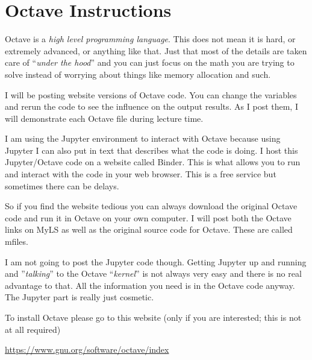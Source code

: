 \documentclass[11pt,letterpaper]{article}
\begin{document}

\section*{Octave Instructions}

Octave is a \textit{high level programming language}.  This does not mean it is hard, or extremely advanced, or anything like that. Just that most of the details are taken care of ``\textit{under the hood}'' and  you can just focus on the math you are trying to solve instead of worrying about things like memory allocation and such.

I will be posting website versions of Octave code.  You can change the variables and rerun the code to see the influence on the output results. As I post them, I will demonstrate each Octave file during lecture time.

I am using the Jupyter environment to interact with Octave because using Jupyter I can also put in text that describes what the code is doing.  I host this Jupyter/Octave code on a website called Binder. This is what allows  you to run and interact with the code in your web browser.  This is a free service but sometimes there can be delays.

So if you find the website tedious you can always download the original Octave code and run it in Octave on your own computer.  I will post both the Octave links on MyLS as well as the original source code for Octave.  These are called mfiles.

I am not going to post the Jupyter code though.  Getting Jupyter up and running and ''\textit{talking}'' to the Octave ``\textit{kernel}'' is not always very easy and there is no real advantage to that.  All the information you need is in the Octave code anyway.  The Jupyter part is really just cosmetic.

To install Octave please go to this website (only if you are interested; this is not at all required)

\url{https://www.gnu.org/software/octave/index}
\end{document}
